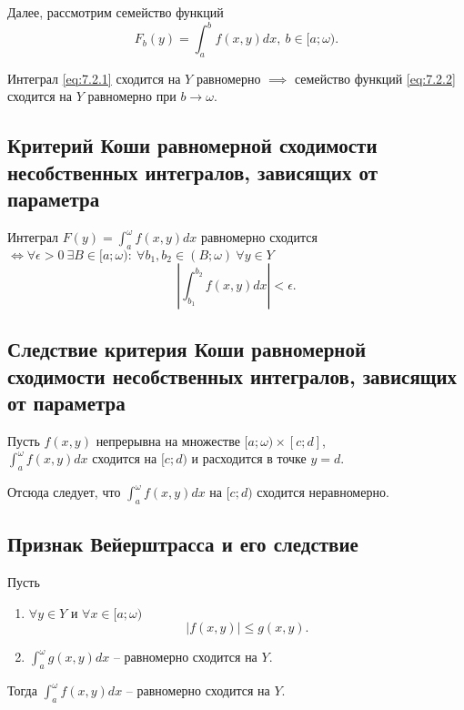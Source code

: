 \begin{note}
    Далее, рассмотрим семейство функций
    \begin{equation}\label{eq:7.2.2}
        F_b(y) = \int_{a}^{b}f(x,y)dx, \ b \in [a;\omega).
    \end{equation}
\end{note}

\begin{statement}
    Интеграл \ref{eq:7.2.1} сходится на $ Y $ равномерно $ \implies $ семейство функций \ref{eq:7.2.2} сходится на $ Y $ равномерно при $ b \rightarrow \omega $.
\end{statement}

\subsection{Критерий Коши равномерной сходимости несобственных интегралов, зависящих от параметра}

\begin{theorem}
    Интеграл $F(y) = \int_{a}^{\omega}f(x,y)dx$ равномерно сходится $\iff \forall \epsilon > 0 \ \exists B \in [a;\omega): \ \forall b_1,b_2 \in (B;\omega) \ \forall y \in Y$
    \[
        \left|\int_{b_1}^{b_2}f(x,y)dx\right| < \epsilon.
    \]
\end{theorem}

\newpage

\subsection{Следствие критерия Коши равномерной сходимости несобственных интегралов, зависящих от параметра}

\begin{corollary}
    Пусть $f(x,y)$ непрерывна на множестве $[a;\omega)\times[c;d] $, \\ $\int_{a}^{\omega}f(x,y)dx$ сходится на $[c;d)$ и расходится в точке $y = d$.

    Отсюда следует, что $\int_{a}^{\omega}f(x,y)dx$ на $[c;d)$ сходится неравномерно.
\end{corollary}

\subsection{Признак Вейерштрасса и его следствие}

\begin{theorem}
    Пусть \begin{enumerate}
        \item $\forall y \in Y$ и $\forall x \in [a;\omega)$
              \[
                  \big|f(x,y)\big| \leqslant g(x,y).
              \]
        \item $\int_{a}^{\omega}g(x,y)dx$ -- равномерно сходится на $Y$.
    \end{enumerate}

    Тогда $\int_{a}^{\omega}f(x,y)dx$ -- равномерно сходится на $Y$.
\end{theorem}

